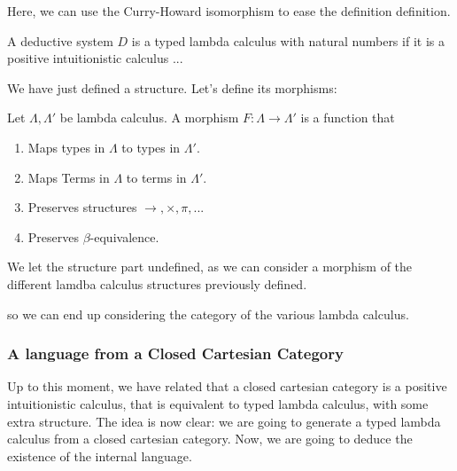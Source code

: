 \begin{definition}
Here, we can use the Curry-Howard isomorphism to ease the definition definition.
\begin{definition}
  A deductive system $D$ is a typed lambda calculus with natural numbers if it is a positive intuitionistic calculus ...
\end{definition}

We have just defined a structure. Let's define its morphisms:

\begin{definition}
  Let $\Lambda, \Lambda '$ be lambda calculus. A morphism $F: \Lambda \to \Lambda '$ is a function that
  \begin{enumerate}
  \item Maps types in $\Lambda$ to types in $\Lambda '$.
  \item Maps Terms in $\Lambda$ to terms in $\Lambda '$.
  \item Preserves structures $\to, \times, \pi, ...$
  \item Preserves $\beta$-equivalence.
\end{enumerate}
\end{definition}
\begin{remark}
We let the structure part undefined, as we can consider a morphism of the different lamdba calculus structures previously defined.
\end{remark}
so we can end up considering the category of the various lambda calculus. 



\subsubsection{A language from a Closed Cartesian Category}

Up to this moment, we have related that a closed cartesian category is a positive intuitionistic calculus, that is equivalent to  typed lambda calculus, with some extra structure. The idea is now clear: we are going to generate a typed lambda calculus from a closed cartesian category. Now, we are going to deduce the existence of the internal language.\\


\end{definition}
